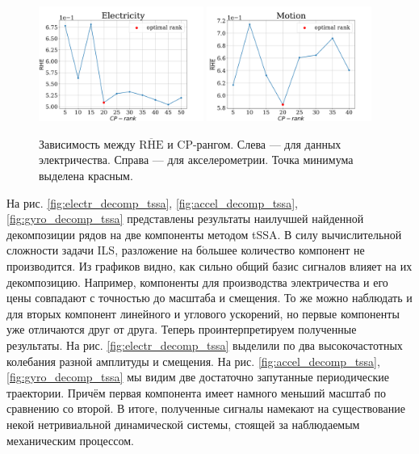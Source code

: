			\begin{figure}[h]
				\centering
				\includegraphics[width=0.48\textwidth, keepaspectratio]{../experiments/electricity/tssa/figs/decomposition/RHE_mean.png}
				\includegraphics[width=0.48\textwidth, keepaspectratio]{../experiments/motion_1/tssa/figs/decomposition/RHE_mean.png}
				\caption{Зависимость между $ \overline{\text{RHE}} $ и CP-рангом. Слева --- для данных электричества. Справа --- для акселерометрии. Точка минимума выделена красным.}\label{fig:decomp_rhe_rank}
			\end{figure}
			
			На рис. \ref{fig:electr_decomp_tssa}, \ref{fig:accel_decomp_tssa}, \ref{fig:gyro_decomp_tssa} представлены результаты наилучшей найденной декомпозиции рядов на две компоненты методом tSSA. В силу вычислительной сложности задачи ILS, разложение на б$\acute{\text{о}}$льшее количество компонент не производится. Из графиков видно, как сильно общий базис сигналов влияет на их декомпозицию. Например, компоненты для производства электричества и его цены совпадают с точностью до масштаба и смещения. То же можно наблюдать и для вторых компонент линейного и углового ускорений, но первые компоненты уже отличаются друг от друга. Теперь проинтерпретируем полученные результаты. На рис. \ref{fig:electr_decomp_tssa} выделили по два высокочастотных колебания разной амплитуды и смещения. На рис. \ref{fig:accel_decomp_tssa}, \ref{fig:gyro_decomp_tssa} мы видим две достаточно запутанные периодические траектории. Причём первая компонента имеет намного меньший масштаб по сравнению со второй. В итоге, полученные сигналы намекают на существование некой нетривиальной динамической системы, стоящей за наблюдаемым механическим процессом.
			
